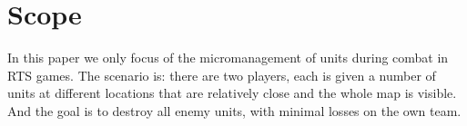 \section{Scope}
In this paper we only focus of the micromanagement of units during combat in RTS games.
The scenario is: there are two players, each is given a number of units at different locations that are relatively close and the whole map is visible. And the goal is to destroy all enemy units, with minimal losses on the own team.

